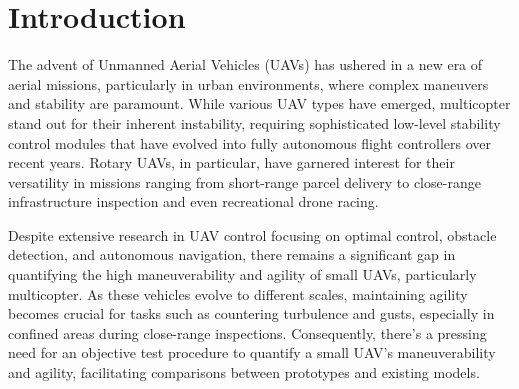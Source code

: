 \documentclass{Configuration_Files/PoliMi3i_thesis}
\begin{document}


\mainmatter %


\listoffigures

\listoftables

\chapter*{Introduction}

The advent of Unmanned Aerial Vehicles (UAVs) has ushered in a new era of aerial missions, particularly in urban environments, where complex maneuvers and stability are paramount. While various UAV types have emerged, multicopter stand out for their inherent instability, requiring sophisticated low-level stability control modules that have evolved into fully autonomous flight controllers over recent years. Rotary UAVs, in particular, have garnered interest for their versatility in missions ranging from short-range parcel delivery to close-range infrastructure inspection and even recreational drone racing.

Despite extensive research in UAV control focusing on optimal control, obstacle detection, and autonomous navigation, there remains a significant gap in quantifying the high maneuverability and agility of small UAVs, particularly multicopter. As these vehicles evolve to different scales, maintaining agility becomes crucial for tasks such as countering turbulence and gusts, especially in confined areas during close-range inspections. Consequently, there's a pressing need for an objective test procedure to quantify a small UAV's maneuverability and agility, facilitating comparisons between prototypes and existing models.
\end{document}

